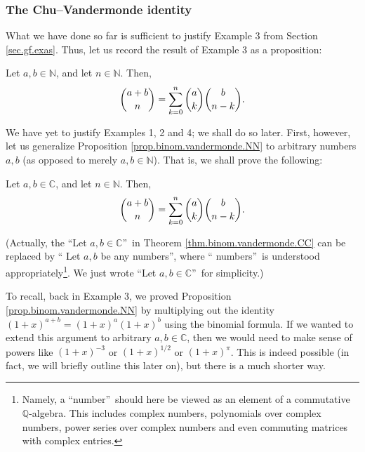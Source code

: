 \subsubsection{\label{subsec.gf.defs.cvi}The Chu--Vandermonde identity}

What we have done so far is sufficient to justify Example 3 from Section
\ref{sec.gf.exas}. Thus, let us record the result of Example 3 as a proposition:

\begin{proposition}
\label{prop.binom.vandermonde.NN}Let $a,b\in\mathbb{N}$, and let
$n\in\mathbb{N}$. Then,%
\begin{equation}
\dbinom{a+b}{n}=\sum_{k=0}^{n}\dbinom{a}{k}\dbinom{b}{n-k}.
\label{eq.prop.binom.vandermonde.NN.eq}%
\end{equation}

\end{proposition}

We have yet to justify Examples 1, 2 and 4; we shall do so later. First,
however, let us generalize Proposition \ref{prop.binom.vandermonde.NN} to
arbitrary numbers $a,b$ (as opposed to merely $a,b\in\mathbb{N}$). That is, we
shall prove the following:

\begin{theorem}
\label{thm.binom.vandermonde.CC}Let $a,b\in\mathbb{C}$, and let
$n\in\mathbb{N}$. Then,%
\begin{equation}
\dbinom{a+b}{n}=\sum_{k=0}^{n}\dbinom{a}{k}\dbinom{b}{n-k}.
\label{eq.prop.binom.vandermonde.CC.eq}%
\end{equation}

\end{theorem}

(Actually, the \textquotedblleft Let $a,b\in\mathbb{C}$\textquotedblright\ in
Theorem \ref{thm.binom.vandermonde.CC} can be replaced by \textquotedblleft
Let $a,b$ be any numbers\textquotedblright, where \textquotedblleft
numbers\textquotedblright\ is understood appropriately\footnote{Namely, a
\textquotedblleft number\textquotedblright\ should here be viewed as an
element of a commutative $\mathbb{Q}$-algebra. This includes complex numbers,
polynomials over complex numbers, power series over complex numbers and even
commuting matrices with complex entries.}. We just wrote \textquotedblleft Let
$a,b\in\mathbb{C}$\textquotedblright\ for simplicity.)

To recall, back in Example 3, we proved Proposition
\ref{prop.binom.vandermonde.NN} by multiplying out the identity $\left(
1+x\right)  ^{a+b}=\left(  1+x\right)  ^{a}\left(  1+x\right)  ^{b}$ using the
binomial formula. If we wanted to extend this argument to arbitrary
$a,b\in\mathbb{C}$, then we would need to make sense of powers like $\left(
1+x\right)  ^{-3}$ or $\left(  1+x\right)  ^{1/2}$ or $\left(  1+x\right)
^{\pi}$. This is indeed possible (in fact, we will briefly outline this later
on), but there is a much shorter way.

